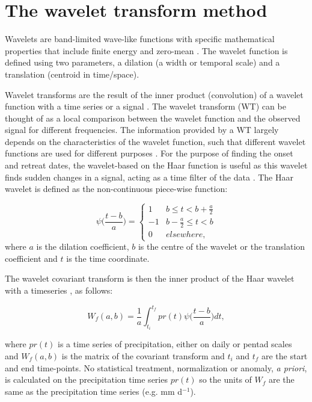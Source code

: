 \section{The wavelet transform method}


Wavelets are band-limited wave-like functions with specific mathematical properties that include  finite energy and zero-mean \citep{whitcher2000,addison2017}.
The wavelet function is defined using two parameters, a dilation (a width or temporal scale) and a translation (centroid in time/space).

Wavelet transforms are the result of the inner product (convolution) of a wavelet function with  a time series or a signal \citep{addison2017}. 
The wavelet transform (WT) can be thought of as a local comparison between the wavelet function and the observed signal for different frequencies.
The information provided by a WT largely depends on the characteristics of the wavelet function, such that different wavelet functions are used for different purposes \citep{addison2017}. For the purpose of finding the onset and retreat dates, the wavelet-based on the Haar function is useful as this wavelet finds sudden changes in a signal, acting as a time filter of the data \citep{addison2017,brooks2003}. The Haar wavelet is defined as the non-continuous piece-wise function:

\begin{equation}
\psi \bigg(\frac{t-b}{a}\bigg)=
\begin{cases}
      1 & b\leq t < b+\frac{a}{2} \\
      -1 & b-\frac{a}{2} \leq t < b \\
      0 & elsewhere,
   \end{cases}
   \label{eq:haar}
\end{equation}
%
\noindent where $a$ is the dilation coefficient, $b$ is the centre of the wavelet or the translation coefficient and $t$ is the time coordinate.

The wavelet covariant transform is then the inner product of the Haar wavelet with a timeseries \citep{brooks2003}, as follows:

\begin{equation}
W_f(a,b)=\frac{1}{a}\int_{t_i}^{t_f}pr(t)\psi \bigg(\frac{t-b}{a}\bigg) dt,
   \label{eq:wf}
\end{equation}

\noindent where $pr(t)$ is a time series of precipitation, either on daily or pentad scales and $W_f(a,b)$ is the matrix of the covariant transform and $t_i$ and $t_f$ are the start and end time-points. No statistical treatment, normalization or anomaly, \textit{a priori}, is calculated on the precipitation time series $pr(t)$ so the units of $W_f$ are the same as the precipitation time series (e.g. mm d$^{-1}$).

